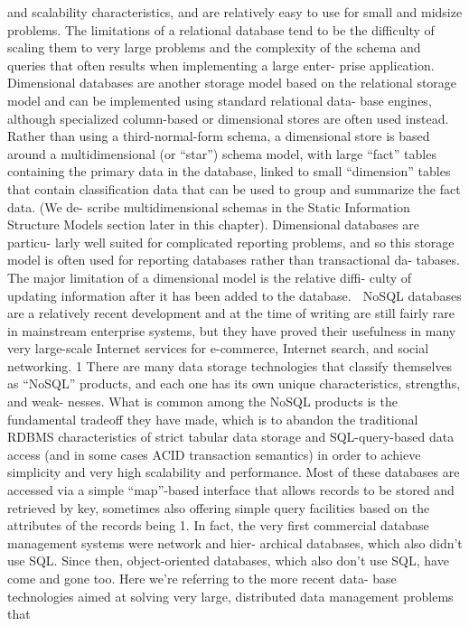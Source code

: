 and scalability characteristics, and are relatively easy to use for small and
midsize problems. The limitations of a relational database tend to be the
difficulty of scaling them to very large problems and the complexity of the
schema and queries that often results when implementing a large enter-
prise application.
 Dimensional databases are another storage model based on the relational
storage model and can be implemented using standard relational data-
base engines, although specialized column-based or dimensional stores
are often used instead. Rather than using a third-normal-form schema, a
dimensional store is based around a multidimensional (or “star”)
schema model, with large “fact” tables containing the primary data in the
database, linked to small “dimension” tables that contain classification
data that can be used to group and summarize the fact data. (We de-
scribe multidimensional schemas in the Static Information Structure
Models section later in this chapter). Dimensional databases are particu-
larly well suited for complicated reporting problems, and so this storage
model is often used for reporting databases rather than transactional da-
tabases. The major limitation of a dimensional model is the relative diffi-
culty of updating information after it has been added to the database.
 NoSQL databases are a relatively recent development and at the time of
writing are still fairly rare in mainstream enterprise systems, but they
have proved their usefulness in many very large-scale Internet services
for e-commerce, Internet search, and social networking. 1 There are many
data storage technologies that classify themselves as “NoSQL” products,
and each one has its own unique characteristics, strengths, and weak-
nesses. What is common among the NoSQL products is the fundamental
tradeoff they have made, which is to abandon the traditional RDBMS
characteristics of strict tabular data storage and SQL-query-based data
access (and in some cases ACID transaction semantics) in order to
achieve simplicity and very high scalability and performance. Most of
these databases are accessed via a simple “map”-based interface that
allows records to be stored and retrieved by key, sometimes also offering
simple query facilities based on the attributes of the records being
1. In fact, the very first commercial database management systems were network and hier-
archical databases, which also didn’t use SQL. Since then, object-oriented databases, which
also don’t use SQL, have come and gone too. Here we’re referring to the more recent data-
base technologies aimed at solving very large, distributed data management problems that
